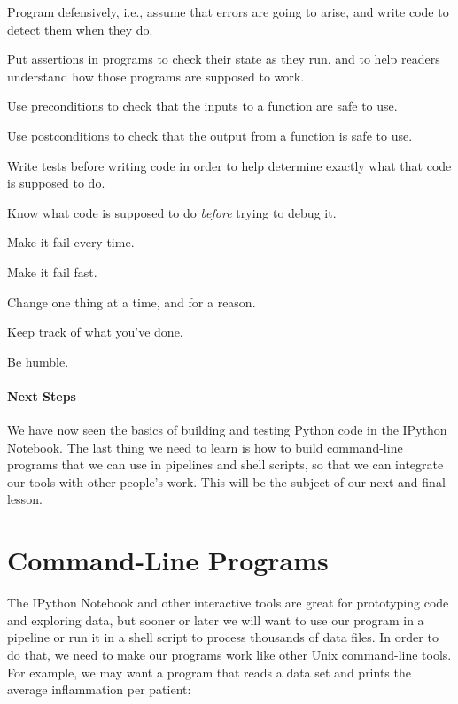 \documentclass{book}
\begin{document}
\begin{swcitemize}
\item
  Program defensively, i.e., assume that errors are going to arise, and
  write code to detect them when they do.
\item
  Put assertions in programs to check their state as they run, and to
  help readers understand how those programs are supposed to work.
\item
  Use preconditions to check that the inputs to a function are safe to
  use.
\item
  Use postconditions to check that the output from a function is safe to
  use.
\item
  Write tests before writing code in order to help determine exactly
  what that code is supposed to do.
\item
  Know what code is supposed to do \emph{before} trying to debug it.
\item
  Make it fail every time.
\item
  Make it fail fast.
\item
  Change one thing at a time, and for a reason.
\item
  Keep track of what you've done.
\item
  Be humble.
\end{swcitemize}

\mbox{}\paragraph{Next Steps}

We have now seen the basics of building and testing Python code in the
IPython Notebook. The last thing we need to learn is how to build
command-line programs that we can use in pipelines and shell scripts, so
that we can integrate our tools with other people's work. This will be
the subject of our next and final lesson.

\section{Command-Line Programs}

The IPython Notebook and other interactive tools are great for
prototyping code and exploring data, but sooner or later we will want to
use our program in a pipeline or run it in a shell script to process
thousands of data files. In order to do that, we need to make our
programs work like other Unix command-line tools. For example, we may
want a program that reads a data set and prints the average inflammation
per patient:
\end{document}
